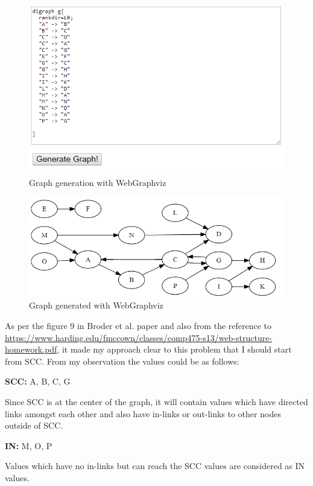 \documentclass[letterpaper,12pt]{article}
\begin{document}
\begin{figure}[h]
\includegraphics[scale=0.7]{graph1.png}
\caption{Graph generation with WebGraphviz}
\label{fig:q3graph1}
\end{figure}

\begin{figure}[h]
\includegraphics[scale=0.6]{graph2.png}
\caption{Graph generated with WebGraphviz}
\label{fig:q3graph2}
\end{figure}

As per the figure 9 in Broder et al. paper and also from the reference to \url{https://www.harding.edu/fmccown/classes/comp475-s13/web-structure-homework.pdf}, it made my approach clear to this problem that I should start from SCC. From my observation the values could be as follows:

\textbf{SCC:} A, B, C, G

Since SCC is at the center of the graph, it will contain values which have directed links amongst each other and also have in-links or out-links to other nodes outside of SCC. 

\textbf{IN:} M, O, P

Values which have no in-links but can reach the SCC values are considered as IN values.
\end{document}
